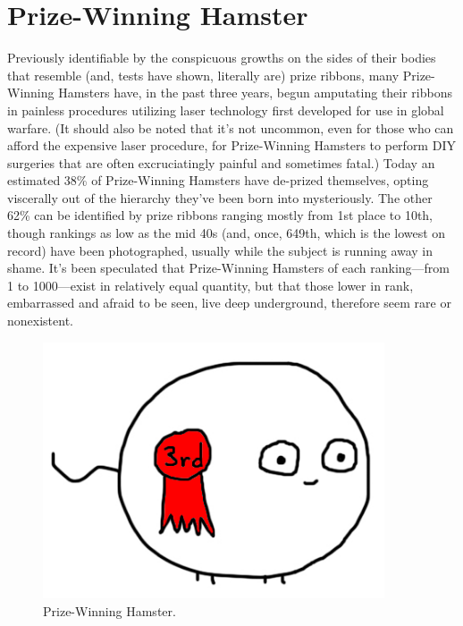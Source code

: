 \documentclass[10pt,twoside,openright]{memoir}
\begin{document}
\chapter*{Prize-Winning Hamster}

Previously identifiable by the conspicuous growths on the sides of their bodies
that resemble (and, tests have shown, literally are) prize ribbons, many
Prize-Winning Hamsters have, in the past three years, begun amputating their
ribbons in painless procedures utilizing laser technology first developed for
use in global warfare. (It should also be noted that it's not uncommon, even
for those who can afford the expensive laser procedure, for Prize-Winning
Hamsters to perform DIY surgeries that are often excruciatingly painful and
sometimes fatal.) Today an estimated 38\% of Prize-Winning Hamsters have
de-prized themselves, opting viscerally out of the hierarchy they've been
born into mysteriously. The other 62\% can be identified by prize ribbons ranging
mostly from 1st place to 10th, though rankings as low as the mid 40s (and, once,
649th, which is the lowest on record) have been photographed, usually while the
subject is running away in shame. It's been speculated that Prize-Winning
Hamsters of each ranking---from 1 to 1000---exist in relatively equal
quantity, but that those lower in rank, embarrassed and afraid to be seen, live
deep underground, therefore seem rare or nonexistent. 

\begin{figure}[t!]
\begin{center}
\includegraphics[width=0.9\textwidth]{img/prizewinning}
\end{center}
\caption*{Prize-Winning Hamster.}
\end{figure}
\end{document}
